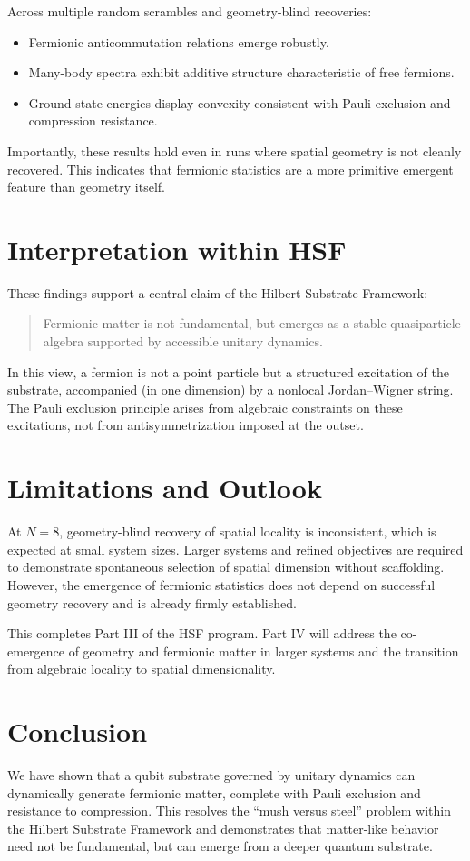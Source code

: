 \documentclass[11pt]{article}
\begin{document}
Across multiple random scrambles and geometry-blind recoveries:
\begin{itemize}
    \item Fermionic anticommutation relations emerge robustly.
    \item Many-body spectra exhibit additive structure characteristic of free fermions.
    \item Ground-state energies display convexity consistent with Pauli exclusion and compression resistance.
\end{itemize}

Importantly, these results hold even in runs where spatial geometry is not cleanly recovered. This indicates that fermionic statistics are a more primitive emergent feature than geometry itself.

\section{Interpretation within HSF}

These findings support a central claim of the Hilbert Substrate Framework:
\begin{quote}
Fermionic matter is not fundamental, but emerges as a stable quasiparticle algebra supported by accessible unitary dynamics.
\end{quote}

In this view, a fermion is not a point particle but a structured excitation of the substrate, accompanied (in one dimension) by a nonlocal Jordan--Wigner string. The Pauli exclusion principle arises from algebraic constraints on these excitations, not from antisymmetrization imposed at the outset.

\section{Limitations and Outlook}

At $N=8$, geometry-blind recovery of spatial locality is inconsistent, which is expected at small system sizes. Larger systems and refined objectives are required to demonstrate spontaneous selection of spatial dimension without scaffolding. However, the emergence of fermionic statistics does not depend on successful geometry recovery and is already firmly established.

This completes Part III of the HSF program. Part IV will address the co-emergence of geometry and fermionic matter in larger systems and the transition from algebraic locality to spatial dimensionality.

\section*{Conclusion}

We have shown that a qubit substrate governed by unitary dynamics can dynamically generate fermionic matter, complete with Pauli exclusion and resistance to compression. This resolves the ``mush versus steel'' problem within the Hilbert Substrate Framework and demonstrates that matter-like behavior need not be fundamental, but can emerge from a deeper quantum substrate.
\end{document}
